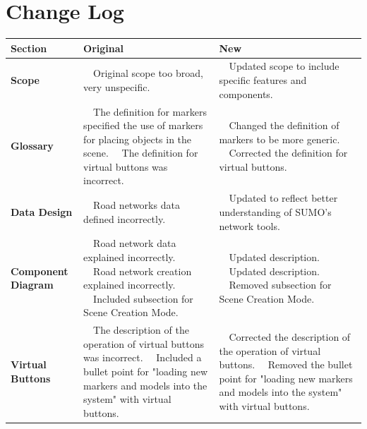\documentclass[letterpaper, 10pt, onecolumn, draftclsnofoot]{IEEEtran}
\newcommand{\tabitem}{\textbullet~~}
\begin{document}
\section{\textbf{Change Log}}
\renewcommand{\arraystretch}{4}
\begin{center}
    \begin{tabular}{|p{4cm}|p{6cm}|p{6cm}|}
        \hline
        \textbf{\large Section} & \textbf{\large Original} & \textbf{\large New} \tabularnewline
        \hline
        \textbf{Scope} & 
        \tabitem Original scope too broad, very unspecific. & 
        \tabitem Updated scope to include specific features and components. \tabularnewline
        \hline
        \textbf{Glossary} & 
        \tabitem The definition for markers specified the use of markers for placing objects in the scene. \newline
        \tabitem The definition for virtual buttons was incorrect. &
        \tabitem Changed the definition of markers to be more generic.  \newline
        \tabitem Corrected the definition for virtual buttons. \tabularnewline
        \hline
        \textbf{Data Design} & 
        \tabitem Road networks data defined incorrectly. &  
        \tabitem Updated to reflect better understanding of SUMO's network tools. \tabularnewline
        \hline
        \textbf{Component Diagram} & 
        \tabitem Road network data explained incorrectly. \newline
        \tabitem Road network creation explained incorrectly. \newline
        \tabitem Included subsection for Scene Creation Mode. & 
        \tabitem Updated description. \newline
        \tabitem Updated description. \newline
        \tabitem Removed subsection for Scene Creation Mode. \tabularnewline
        \hline
        \textbf{Virtual Buttons} & 
        \tabitem The description of the operation of virtual buttons was incorrect. \newline
        \tabitem Included a bullet point for "loading new markers and models into the system" with virtual buttons. & 
        \tabitem Corrected the description of the operation of virtual buttons.  \newline
        \tabitem Removed the bullet point for "loading new markers and models into the system" with virtual buttons. \tabularnewline
        \hline
    \end{tabular}
\end{center}
\newpage
\end{document}
